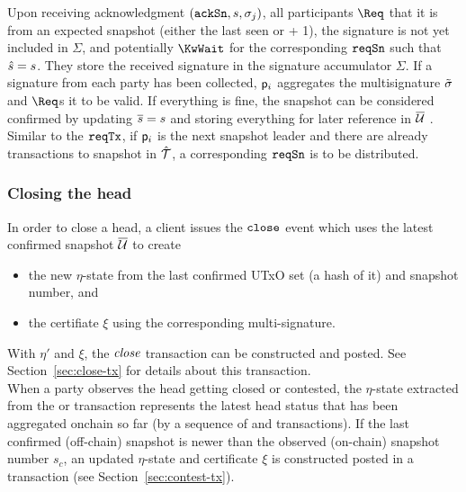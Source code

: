 \quad Upon receiving acknowledgment $(\mathtt{ackSn},s,\sigma_j)$,
all participants $\Req$ that it is from an expected snapshot (either the last
seen or + 1), the signature is not yet included in $\Sigma$, and potentially
$\KwWait$ for the corresponding $\mathtt{reqSn}$ such that $\hat s = s$. They store the
received signature in the signature accumulator $\Sigma$. If a signature from
each party has been collected, $\mathsf p_i$ aggregates the multisignature
$\tilde\sigma$ and $\Req$s it to be valid.  If
everything is fine, the snapshot can be considered confirmed  by updating
$\overline s=s$ and storing everything for later reference in $\overline {\mathcal U}$ . Similar to the $\mathtt{reqTx}$, if $\mathsf p_i$ is the next snapshot leader and there are already transactions to snapshot in $\hat {\mathcal T}$, a corresponding $\mathtt{reqSn}$ is to be distributed.

\subsubsection{Closing the head}

\quad In order to close a head, a client issues the
$\mathtt{close}$ event which uses the latest confirmed snapshot $\overline {\mathcal U}$ to create
\begin{itemize}
  \item the new $\eta$-state from the last confirmed UTxO set (a hash of it) and
        snapshot number, and
  \item the certifiate $\xi$ using the corresponding multi-signature.
\end{itemize}
With $\eta'$ and $\xi$, the $\textit{close}$ transaction can be constructed and
posted. See Section~\ref{sec:close-tx} for details about this transaction.
\\

\quad When a party observes
the head getting closed or contested, the $\eta$-state extracted from the
\mtxClose{} or \mtxContest{} transaction represents the latest head status that
has been aggregated onchain so far (by a sequence of \mtxClose{} and
\mtxContest{} transactions). If the last confirmed (off-chain) snapshot is newer
than the observed (on-chain) snapshot number $s_{c}$, an updated $\eta$-state
and certificate $\xi$ is constructed posted in a \mtxContest{} transaction (see
Section~\ref{sec:contest-tx}).



